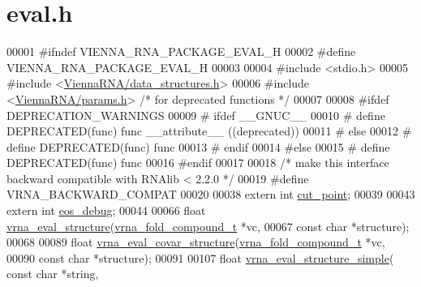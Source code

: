 \hypertarget{eval_8h_source}{}\section{eval.\+h}
\label{eval_8h_source}

\begin{DoxyCode}
00001 \textcolor{preprocessor}{#ifndef VIENNA\_RNA\_PACKAGE\_EVAL\_H}
00002 \textcolor{preprocessor}{#define VIENNA\_RNA\_PACKAGE\_EVAL\_H}
00003 
00004 \textcolor{preprocessor}{#include <stdio.h>}
00005 \textcolor{preprocessor}{#include <\hyperlink{data__structures_8h}{ViennaRNA/data\_structures.h}>}
00006 \textcolor{preprocessor}{#include <\hyperlink{params_8h}{ViennaRNA/params.h}>}   \textcolor{comment}{/* for deprecated functions */}
00007 
00008 \textcolor{preprocessor}{#ifdef DEPRECATION\_WARNINGS}
00009 \textcolor{preprocessor}{# ifdef \_\_GNUC\_\_}
00010 \textcolor{preprocessor}{#  define DEPRECATED(func) func \_\_attribute\_\_ ((deprecated))}
00011 \textcolor{preprocessor}{# else}
00012 \textcolor{preprocessor}{#  define DEPRECATED(func) func}
00013 \textcolor{preprocessor}{# endif}
00014 \textcolor{preprocessor}{#else}
00015 \textcolor{preprocessor}{# define DEPRECATED(func) func}
00016 \textcolor{preprocessor}{#endif}
00017 
00018 \textcolor{comment}{/* make this interface backward compatible with RNAlib < 2.2.0 */}
00019 \textcolor{preprocessor}{#define VRNA\_BACKWARD\_COMPAT}
00020 
00038 \textcolor{keyword}{extern}  \textcolor{keywordtype}{int} \hyperlink{eval_8h_ab9b2c3a37a5516614c06d0ab54b97cda}{cut\_point};
00039 
00043 \textcolor{keyword}{extern}  \textcolor{keywordtype}{int} \hyperlink{eval_8h_a567530678f6260a1a649a5beca5da4c5}{eos\_debug};
00044 
00066 \textcolor{keywordtype}{float} \hyperlink{eval_8h_a58f199f1438d794a265f3b27fc8ea631}{vrna\_eval\_structure}(\hyperlink{group__fold__compound_structvrna__fc__s}{vrna\_fold\_compound\_t} *vc,
00067                           \textcolor{keyword}{const} \textcolor{keywordtype}{char} *structure);
00068 
00089 \textcolor{keywordtype}{float} \hyperlink{eval_8h_a6cea75c0eb9857fb59172be54cab09e0}{vrna\_eval\_covar\_structure}(\hyperlink{group__fold__compound_structvrna__fc__s}{vrna\_fold\_compound\_t} *vc,
00090                                 \textcolor{keyword}{const} \textcolor{keywordtype}{char} *structure);
00091 
00107 \textcolor{keywordtype}{float} \hyperlink{eval_8h_ab6930f446d04761454d033680fbf7909}{vrna\_eval\_structure\_simple}( \textcolor{keyword}{const} \textcolor{keywordtype}{char} *\textcolor{keywordtype}{string},

\end{DoxyCode}

